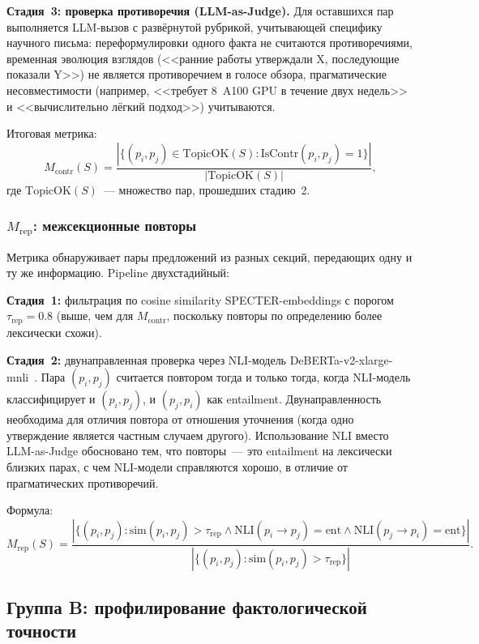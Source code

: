 \documentclass[a4paper,14pt]{extarticle}
\begin{document}
\textbf{Стадия~3: проверка противоречия (LLM-as-Judge).} Для оставшихся пар выполняется LLM-вызов с развёрнутой рубрикой, учитывающей специфику научного письма: переформулировки одного факта не считаются противоречиями, временная эволюция взглядов (<<ранние работы утверждали X, последующие показали Y>>) не является противоречием в голосе обзора, прагматические несовместимости (например, <<требует 8~A100 GPU в течение двух недель>> и <<вычислительно лёгкий подход>>) учитываются.

Итоговая метрика:
\begin{equation}
    M_\mathrm{contr}(S) = \frac{|\{(p_i, p_j) \in \mathrm{TopicOK}(S) : \mathrm{IsContr}(p_i, p_j) = 1\}|}{|\mathrm{TopicOK}(S)|},
\end{equation}
где $\mathrm{TopicOK}(S)$~--- множество пар, прошедших стадию~2.


\subsubsection{$M_\mathrm{rep}$: межсекционные повторы}

Метрика обнаруживает пары предложений из разных секций, передающих одну и ту же информацию. Pipeline двухстадийный:

\textbf{Стадия~1:} фильтрация по cosine similarity SPECTER-embeddings с порогом $\tau_\mathrm{rep} = 0.8$ (выше, чем для $M_\mathrm{contr}$, поскольку повторы по определению более лексически схожи).

\textbf{Стадия~2:} двунаправленная проверка через NLI-модель DeBERTa-v2-xlarge-mnli~\cite{he2021deberta}. Пара $(p_i, p_j)$ считается повтором тогда и только тогда, когда NLI-модель классифицирует и $(p_i, p_j)$, и $(p_j, p_i)$ как entailment. Двунаправленность необходима для отличия повтора от отношения уточнения (когда одно утверждение является частным случаем другого). Использование NLI вместо LLM-as-Judge обосновано тем, что повторы~--- это entailment на лексически близких парах, с чем NLI-модели справляются хорошо, в отличие от прагматических противоречий.

Формула:
\begin{equation}
    M_\mathrm{rep}(S) = \frac{|\{(p_i, p_j) : \mathrm{sim}(p_i, p_j) > \tau_\mathrm{rep} \wedge \mathrm{NLI}(p_i \to p_j) = \mathrm{ent} \wedge \mathrm{NLI}(p_j \to p_i) = \mathrm{ent}\}|}{|\{(p_i, p_j) : \mathrm{sim}(p_i, p_j) > \tau_\mathrm{rep}\}|}.
\end{equation}


\subsection{Группа B: профилирование фактологической точности}
\end{document}
